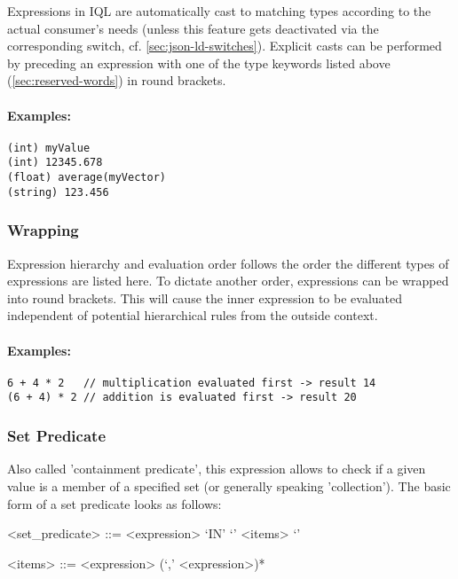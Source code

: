 \documentclass[11pt]{article}
\newcommand{\iql}{IQL\xspace}
\begin{document}
Expressions in \iql are automatically cast to matching types according to the actual consumer's needs (unless this feature gets deactivated via the corresponding switch, cf. \cref{sec:json-ld-switches}). Explicit casts can be performed by preceding an expression with one of the type keywords listed above (\ref{sec:reserved-words}) in round brackets.

\paragraph{Examples:}

\begin{verbatim}
(int) myValue
(int) 12345.678
(float) average(myVector)
(string) 123.456
\end{verbatim}

\subsubsection{Wrapping}
\label{sec:wrapping}

Expression hierarchy and evaluation order follows the order the different types of expressions are listed here. To dictate another order, expressions can be wrapped into round brackets. This will cause the inner expression to be evaluated independent of potential hierarchical rules from the outside context.

\paragraph{Examples:}

\begin{verbatim}
6 + 4 * 2   // multiplication evaluated first -> result 14
(6 + 4) * 2 // addition is evaluated first -> result 20
\end{verbatim}

\subsubsection{Set Predicate}
\label{sec:set-predicate}

Also called 'containment predicate', this expression allows to check if a given value is a member of a specified set (or generally speaking 'collection'). The basic form of a set predicate looks as follows:
\begin{grammar}	
	<set_predicate> ::= <expression> `IN' `{' <items> `}'
	
	<items> ::= <expression> (`,' <expression>)*
\end{grammar}
\end{document}
